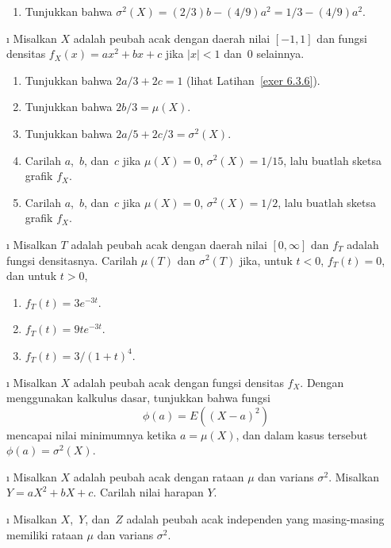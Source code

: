 {\begin{LJSItem}
\begin{enumerate}
\item Tunjukkan bahwa $\sigma^2(X) = (2/3)b - (4/9)a^2 = 1/3 - (4/9)a^2$.
\end{enumerate}

\i\label{exer 6.3.7} Misalkan $X$ adalah peubah acak dengan daerah nilai $[-1,1]$
dan fungsi densitas $f_X(x) = ax^2 + bx + c$ jika $|x| < 1$ dan~0 selainnya.

\begin{enumerate}
\item Tunjukkan bahwa $2a/3 + 2c = 1$ (lihat Latihan~\ref{exer 6.3.6}).

\item Tunjukkan bahwa $2b/3 = \mu(X)$.

\item Tunjukkan bahwa $2a/5 + 2c/3 = \sigma^2(X)$.

\item Carilah $a$,~$b$, dan~$c$ jika $\mu(X) = 0$, $\sigma^2(X) = 1/15$, lalu
buatlah sketsa grafik $f_X$.

\item Carilah $a$,~$b$, dan~$c$ jika $\mu(X) = 0$, $\sigma^2(X) = 1/2$, lalu
buatlah sketsa grafik $f_X$.
\end{enumerate}

\i\label{exer 6.3.8} Misalkan $T$ adalah peubah acak dengan daerah nilai $[0,\infty]$
dan $f_T$ adalah fungsi densitasnya. Carilah $\mu(T)$ dan $\sigma^2(T)$ jika, untuk $t
< 0$, $f_T(t) = 0$, dan untuk $t > 0$,
\begin{enumerate}

\item $f_T(t) = 3e^{-3t}$.

\item $f_T(t) = 9te^{-3t}$.

\item $f_T(t) = 3/(1 + t)^4$.
\end{enumerate}

\i\label{exer 6.3.9} Misalkan $X$ adalah peubah acak dengan fungsi densitas $f_X$.
Dengan menggunakan kalkulus dasar, tunjukkan bahwa fungsi
$$
\phi(a) = E((X - a)^2)
$$ mencapai nilai minimumnya ketika $a = \mu(X)$, dan dalam kasus tersebut $\phi(a) =
\sigma^2(X)$.

\i\label{exer 6.3.10} Misalkan $X$ adalah peubah acak dengan rataan $\mu$ dan varians
$\sigma^2$. Misalkan $Y = aX^2 + bX + c$. Carilah nilai harapan $Y$.

\i\label{exer 6.3.11} Misalkan $X$,~$Y$, dan~$Z$ adalah peubah acak independen yang
masing-masing memiliki rataan $\mu$ dan varians $\sigma^2$.


\end{LJSItem}}
